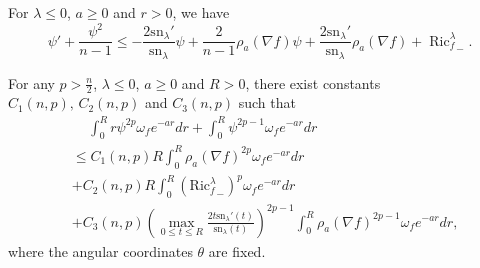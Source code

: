 \documentclass[10pt,a4paper]{amsart}
\newcommand{\sn}{\mathrm{sn}}
\begin{document}
\begin{lemma}\label{riccati}
	For  $\lambda\leq 0$, $a\geq 0$ and $r>0$,   we have
	\begin{equation}
		\psi'+\frac{\psi^2}{n-1}\leq -\frac{2\sn_\lambda'}{\sn_\lambda}\psi+\frac{2}{n-1}\rho_a(\nabla f)\psi+\frac{2\sn_\lambda'}{\sn_\lambda}\rho_a(\nabla f)+{\operatorname{Ric}_f^\lambda}_-.\label{rineq}
	\end{equation}
\end{lemma}

\begin{lemma}\label{intesti}
	For any $p>\frac{n}{2}$, $\lambda\leq 0$, $a\geq 0$ and $R>0$, there exist constants $C_1(n,p),\,C_2(n,p)$ and $C_3(n,p)$ such that
	\begin{equation}
		\begin{aligned}
			&\quad\,\int_{0}^Rr\psi^{2p}\omega_fe^{-ar}dr+\int_0^R\psi^{2p-1}\omega_fe^{-ar}dr
			\\&\leq C_1(n,p)R\int_{0}^{R}\rho_a(\nabla f)^{2p}\omega_fe^{-ar}dr\\&+C_2(n,p)R\int_{0}^R\left({\mathrm{Ric}_f^\lambda}_-\right)^{p}\omega_fe^{-ar}dr\\&+C_3(n,p)\left(\max_{0\leq t\leq R}\frac{2t\sn_\lambda'(t)}{\sn_\lambda(t)}\right)^{2p-1}\int_{0}^R\rho_a(\nabla f)^{2p-1}\omega_fe^{-ar}dr,\label{esti1}
		\end{aligned}
	\end{equation}
	where the angular coordinates $\theta$ are fixed.
\end{lemma}
\end{document}
